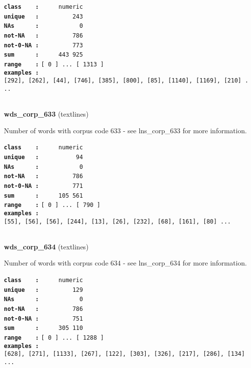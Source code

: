 \documentclass[]{article}
\begin{document}
\textbf{\texttt{class\ \ \ \ :}} \texttt{~~~~~numeric}\\
\textbf{\texttt{unique\ \ \ :}} \texttt{~~~~~~~~~243}\\
\textbf{\texttt{NAs\ \ \ \ \ \ :}} \texttt{~~~~~~~~~~~0}\\
\textbf{\texttt{not-NA\ \ \ :}} \texttt{~~~~~~~~~786}\\
\textbf{\texttt{not-0-NA\ :}} \texttt{~~~~~~~~~773}\\
\textbf{\texttt{sum\ \ \ \ \ \ :}} \texttt{~~~~~443~925}\\
\textbf{\texttt{range\ \ \ \ :}}
\texttt{{[}\ 0\ {]}\ ...\ {[}\ 1313\ {]}}\\
\textbf{\texttt{examples\ :}}
\texttt{{[}292{]},\ {[}262{]},\ {[}44{]},\ {[}746{]},\ {[}385{]},\ {[}800{]},\ {[}85{]},\ {[}1140{]},\ {[}1169{]},\ {[}210{]}\ ...}\\

~

\textbf{wds\_corp\_633} (textlines)

Number of words with corpus code 633 - see lns\_corp\_633 for more
information.

\textbf{\texttt{class\ \ \ \ :}} \texttt{~~~~~numeric}\\
\textbf{\texttt{unique\ \ \ :}} \texttt{~~~~~~~~~~94}\\
\textbf{\texttt{NAs\ \ \ \ \ \ :}} \texttt{~~~~~~~~~~~0}\\
\textbf{\texttt{not-NA\ \ \ :}} \texttt{~~~~~~~~~786}\\
\textbf{\texttt{not-0-NA\ :}} \texttt{~~~~~~~~~771}\\
\textbf{\texttt{sum\ \ \ \ \ \ :}} \texttt{~~~~~105~561}\\
\textbf{\texttt{range\ \ \ \ :}}
\texttt{{[}\ 0\ {]}\ ...\ {[}\ 790\ {]}}\\
\textbf{\texttt{examples\ :}}
\texttt{{[}55{]},\ {[}56{]},\ {[}56{]},\ {[}244{]},\ {[}13{]},\ {[}26{]},\ {[}232{]},\ {[}68{]},\ {[}161{]},\ {[}80{]}\ ...}\\

~

\textbf{wds\_corp\_634} (textlines)

Number of words with corpus code 634 - see lns\_corp\_634 for more
information.

\textbf{\texttt{class\ \ \ \ :}} \texttt{~~~~~numeric}\\
\textbf{\texttt{unique\ \ \ :}} \texttt{~~~~~~~~~129}\\
\textbf{\texttt{NAs\ \ \ \ \ \ :}} \texttt{~~~~~~~~~~~0}\\
\textbf{\texttt{not-NA\ \ \ :}} \texttt{~~~~~~~~~786}\\
\textbf{\texttt{not-0-NA\ :}} \texttt{~~~~~~~~~751}\\
\textbf{\texttt{sum\ \ \ \ \ \ :}} \texttt{~~~~~305~110}\\
\textbf{\texttt{range\ \ \ \ :}}
\texttt{{[}\ 0\ {]}\ ...\ {[}\ 1288\ {]}}\\
\textbf{\texttt{examples\ :}}
\texttt{{[}628{]},\ {[}271{]},\ {[}1133{]},\ {[}267{]},\ {[}122{]},\ {[}303{]},\ {[}326{]},\ {[}217{]},\ {[}286{]},\ {[}134{]}\ ...}\\
\end{document}
